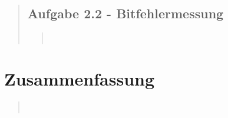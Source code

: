 \begin{quote}
\begin{quote}
    \end{quote}  %
    
    \subsection{Aufgabe 2.2 - Bitfehlermessung}
    \begin{quote}
         \\
    \end{quote}  %
         	
\end{quote}%

    
\section{Zusammenfassung}
\begin{quote}

     \\
\end{quote}%
         



\begin{thebibliography}{999}
%      



\end{thebibliography}


  	    
